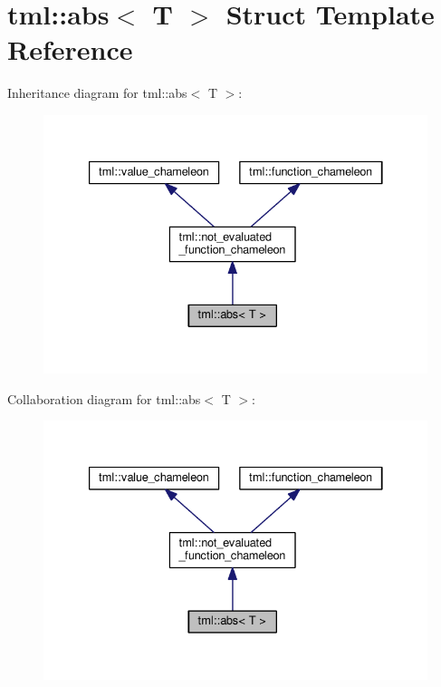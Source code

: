 \hypertarget{structtml_1_1abs}{\section{tml\+:\+:abs$<$ T $>$ Struct Template Reference}
\label{structtml_1_1abs}
}


Inheritance diagram for tml\+:\+:abs$<$ T $>$\+:
\nopagebreak
\begin{figure}[H]
\begin{center}
\leavevmode
\includegraphics[width=333pt]{structtml_1_1abs__inherit__graph}
\end{center}
\end{figure}


Collaboration diagram for tml\+:\+:abs$<$ T $>$\+:
\nopagebreak
\begin{figure}[H]
\begin{center}
\leavevmode
\includegraphics[width=333pt]{structtml_1_1abs__coll__graph}
\end{center}
\end{figure}
